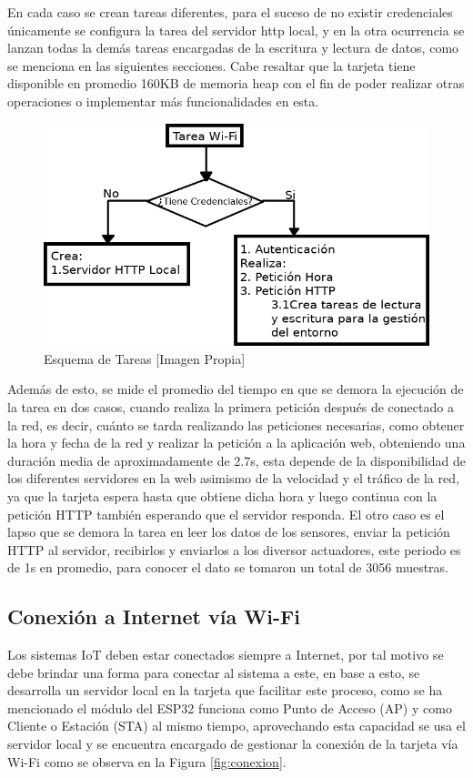 En cada caso se crean tareas diferentes, para el suceso de no existir credenciales únicamente se configura la tarea del servidor http local, y en la otra ocurrencia se lanzan todas la demás tareas encargadas de la escritura y lectura de datos, como se menciona en las siguientes secciones. Cabe resaltar que la tarjeta tiene disponible en promedio 160KB de memoria heap con el fin de poder realizar otras operaciones o implementar más funcionalidades en esta.\\

\begin{figure}[H]
	\centering
	\caption{Esquema de Tareas [Imagen Propia]}
	\label{fig:tareas}
	\includegraphics[width=0.7\linewidth]{Imagenes/tareas}
\end{figure}

Además de esto, se mide el promedio del tiempo en que se demora la ejecución de la tarea en dos casos, cuando realiza la primera petición después de conectado a la red, es decir, cuánto se tarda realizando las peticiones necesarias, como obtener la hora y fecha de la red y realizar la petición a la aplicación web, obteniendo una duración media de aproximadamente de 2.7s, esta depende de la disponibilidad de los diferentes servidores en la web asimismo de la velocidad y el tráfico de la red, ya que la tarjeta espera hasta que obtiene dicha hora y luego continua con la petición HTTP también esperando que el servidor responda. El otro caso es el lapso que se demora la tarea en leer los datos de los sensores, enviar la petición HTTP al servidor, recibirlos y enviarlos a los diversor actuadores, este periodo es de 1s en promedio, para conocer el dato se tomaron un total de 3056 muestras.

\subsection{Conexión a Internet vía Wi-Fi}\label{sub:wifi}

Los sistemas IoT deben estar conectados siempre a Internet, por tal motivo se debe brindar una forma para conectar al sistema a este, en base a esto, se desarrolla un servidor local en la tarjeta que facilitar este proceso, como se ha mencionado el módulo del ESP32 funciona como Punto de Acceso (AP) y como Cliente o Estación (STA) al mismo tiempo, aprovechando esta capacidad se usa el servidor local y se encuentra encargado de gestionar la conexión de la tarjeta vía Wi-Fi como se observa en la Figura \ref{fig:conexion}.\\

